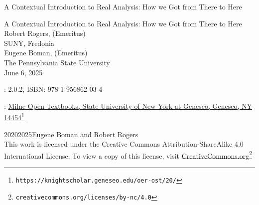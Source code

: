 \documentclass[oneside,10pt,]{book}
\newcommand{\titlepagefont}{\relax}
\numberwithin{equation}{part}
\begin{document}
\raggedbottom
\frontmatter
\thispagestyle{empty}
{\titlepagefont\centering
\vspace*{0.28\textheight}
{\Huge A Contextual Introduction to Real Analysis: How we Got from There to Here}\\}
\clearpage
\thispagestyle{empty}
{\titlepagefont\centering
\vspace*{0.14\textheight}
{\Huge A Contextual Introduction to Real Analysis: How we Got from There to Here}\\[3\baselineskip]
{\Large Robert Rogers, (Emeritus)}\\[0.5\baselineskip]
{\Large SUNY, Fredonia}\\[3\baselineskip]
{\Large Eugene Boman, (Emeritus)}\\[0.5\baselineskip]
{\Large The Pennsylvania State University}\\[3\baselineskip]
{\Large June 6, 2025}\\}
\clearpage
\thispagestyle{empty}
\hypertarget{front-colophon}{}
: 2.0.2, ISBN: 978-1-956862-03-4\par\medskip
{}: \href{https://knightscholar.geneseo.edu/oer-ost/20/}{Milne Open Textbooks, State University of New York at Geneseo, Geneseo, NY 14454}\footnote{\nolinkurl{https://knightscholar.geneseo.edu/oer-ost/20/}\label{ASORA-2-1-5-2}}\par\medskip
\noindent\textcopyright{}2020\textendash{}2025\quad{}Eugene Boman and Robert Rogers\\[0.5\baselineskip]
This work is licensed under the Creative Commons Attribution-ShareAlike 4.0 International License.  To view a copy of this license, visit \href{http://creativecommons.org/licenses/by-nc/4.0/}{CreativeCommons.org}\footnote{\nolinkurl{creativecommons.org/licenses/by-nc/4.0}\label{ASORA-2-1-6-3-2}}\par\medskip
{}
\null\clearpage
%
%
\typeout{************************************************}
\typeout{************************************************}
\end{document}
